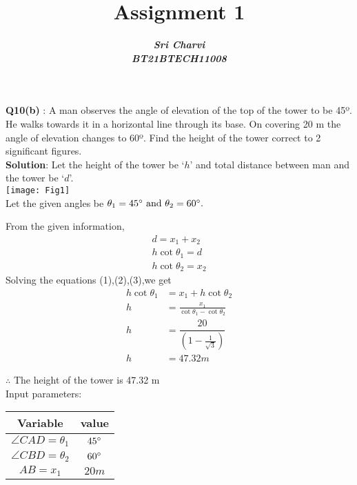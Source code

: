 \documentclass[journal,12pt,twocolumn]{IEEEtran}
\title{ Assignment 1}
\author{\textbf{\textit{Sri Charvi}}\\
\textbf{\textit{BT21BTECH11008}}}
\begin{document}
\maketitle
\textbf{Q10(b) }: A man observes the angle of elevation of the top of the tower to be 45º.
 He walks towards it in a horizontal line through its base. On covering 20 m the angle of 
elevation changes to 60º. Find the height of the tower correct to 2 significant figures.\\

\medskip
\textbf{Solution}: Let the height of the tower be `$h$' and total distance between man and the tower be `$d$'.\\

\texttt{[image: Fig1]}\\
 Let the given angles
be $\theta_1=45\degree \text{ and } \theta_2=60\degree.$

From the given information,
\begin{align}
d=x_1+x_2\\
h\cot\theta_1=d\\
h\cot\theta_2=x_2
\end{align}
Solving the equations (1),(2),(3),we get
\begin{align*}
 h\cot\theta_1&=x_1+h\cot\theta_2\\
 h&=\frac{x_1}{\cot\theta_1-\cot\theta_2}\\
 h&=\dfrac{20}{\left(1-\frac{1}{\sqrt{3}}\right)}\\
 h &= 47.32m
\end{align*}

$\therefore $ The height of the tower is 47.32 m\\


Input parameters:\\

\begin{tabular}{|c|c|}

\hline
\textbf{Variable} & \textbf{value}\\ \hline

$\angle CAD = \theta_1$ & $45\degree$\\ \hline
$\angle CBD = \theta_2$ & $60\degree$\\ \hline
$AB = x_1$ & $20m$\\ \hline






\end{tabular}
\end{document}

